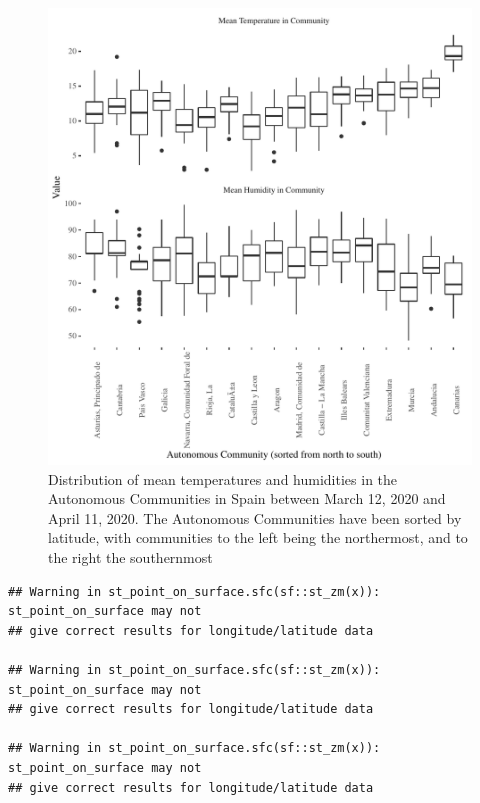 \documentclass[]{elsarticle} %
\makeatletter
\def\maxwidth{\ifdim\Gin@nat@width>\linewidth\linewidth
\else\Gin@nat@width\fi}
\let\Oldincludegraphics\includegraphics
\renewcommand{\includegraphics}[1]{\Oldincludegraphics[width=\maxwidth]{#1}}
\makeatother
\begin{document}
\begin{figure}
\centering
\includegraphics{Environmental-Correlates-of-COVID19-Spain_files/figure-latex/descriptives-temperature-1.pdf}
\caption{\label{fig:descriptives-temperature} Distribution of mean
temperatures and humidities in the Autonomous Communities in Spain
between March 12, 2020 and April 11, 2020. The Autonomous Communities
have been sorted by latitude, with communities to the left being the
northermost, and to the right the southernmost}
\end{figure}

\begin{verbatim}
## Warning in st_point_on_surface.sfc(sf::st_zm(x)): st_point_on_surface may not
## give correct results for longitude/latitude data

## Warning in st_point_on_surface.sfc(sf::st_zm(x)): st_point_on_surface may not
## give correct results for longitude/latitude data

## Warning in st_point_on_surface.sfc(sf::st_zm(x)): st_point_on_surface may not
## give correct results for longitude/latitude data
\end{verbatim}
\end{document}
